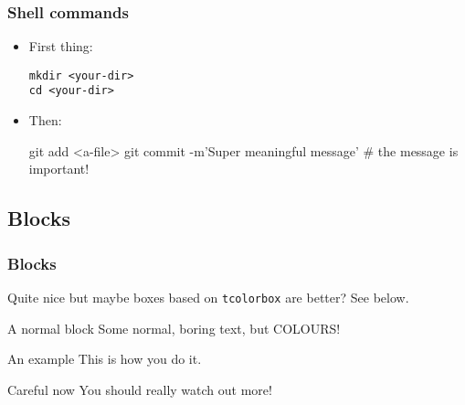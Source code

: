 \documentclass[mathserif, fleqn]{beamer}
\begin{document}
\begin{frame}[fragile]\frametitle{Shell commands}
  \begin{itemize}
  \item First thing:
    \begin{lstlisting}[language=aiphishell, style=aiphishell]
mkdir <your-dir>
cd <your-dir>
    \end{lstlisting}
  \item Then:
    \begin{aiphishell}
git add <a-file>
git commit -m'Super meaningful message'  # the message is important!
    \end{aiphishell}
  \end{itemize}
\end{frame}

\subsection{Blocks}
\begin{frame}\frametitle{Blocks}
  Quite nice but maybe boxes based on \texttt{tcolorbox} are better? See below.
  \begin{block}{A normal block}
    Some normal, boring text, but COLOURS!
  \end{block}
  \begin{exampleblock}{An example}
    This is how you do it.
  \end{exampleblock}
  \begin{alertblock}{Careful now}
    You should really watch out more!
  \end{alertblock}
\end{frame}
\end{document}
